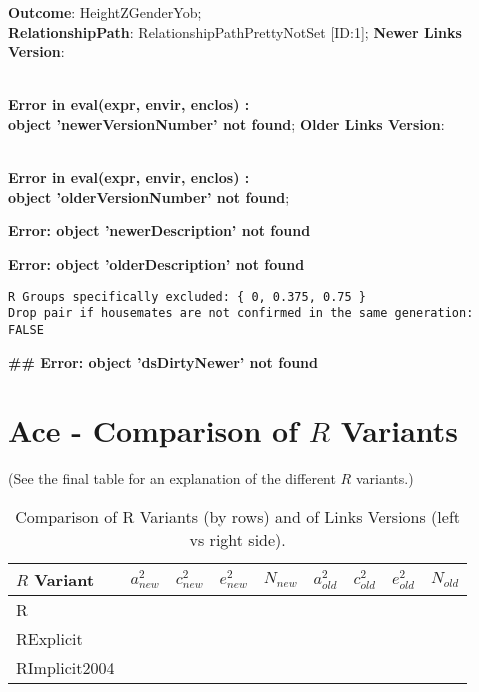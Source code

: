 \documentclass{article}\usepackage{graphicx, color}
\makeatletter
\newenvironment{kframe}{%
 \def\at@end@of@kframe{}%
 \ifinner\ifhmode%
  \def\at@end@of@kframe{\end{minipage}}%
  \begin{minipage}{\columnwidth}%
 \fi\fi%
 \def\FrameCommand##1{\hskip\@totalleftmargin \hskip-\fboxsep
 \colorbox{shadecolor}{##1}\hskip-\fboxsep
     \hskip-\linewidth \hskip-\@totalleftmargin \hskip\columnwidth}%
 \MakeFramed {\advance\hsize-\width
   \@totalleftmargin\z@ \linewidth\hsize
   \@setminipage}}%
 {\par\unskip\endMakeFramed%
 \at@end@of@kframe}
\newenvironment{knitrout}{}{} %
\makeatother
\begin{document}
\textbf{Outcome}: HeightZGenderYob;\\
\textbf{RelationshipPath}: RelationshipPathPrettyNotSet [ID:1];
\textbf{Newer Links Version}: 

{\ttfamily\noindent\bfseries\textcolor{errorcolor}{\\Error in eval(expr, envir, enclos) : \\  object 'newerVersionNumber' not found}};
\textbf{Older Links Version}: 

{\ttfamily\noindent\bfseries\textcolor{errorcolor}{\\Error in eval(expr, envir, enclos) : \\  object 'olderVersionNumber' not found}};

\begin{knitrout}
\color{fgcolor}\begin{kframe}


{\ttfamily\noindent\bfseries\textcolor{errorcolor}{Error: object 'newerDescription' not found}}

{\ttfamily\noindent\bfseries\textcolor{errorcolor}{Error: object 'olderDescription' not found}}\begin{verbatim}
R Groups specifically excluded: { 0, 0.375, 0.75 }
Drop pair if housemates are not confirmed in the same generation: FALSE
\end{verbatim}
\end{kframe}
\end{knitrout}


\begin{kframe}


{\ttfamily\noindent\bfseries\textcolor{errorcolor}{\#\# Error: object 'dsDirtyNewer' not found}}\end{kframe}


\section{Ace - Comparison of $R$ Variants} 
(See the final table for an explanation of the different $R$ variants.)
\begin{table}[ht]
\begin{center}
{\large
\begin{tabular}{l|rrrr|rrrr}
  \hline
$R$ Variant & $a_{new}^2$ & $c_{new}^2$ & $e_{new}^2$ & $N_{new}$ & $a_{old}^2$ & $c_{old}^2$ & $e_{old}^2$ & $N_{old}$ \\ 
  \hline
R &  &  &  &  &  &  &  &  \\ 
  RExplicit &  &  &  &  &  &  &  &  \\ 
  RImplicit2004 &  &  &  &  &  &  &  &  \\ 
   \hline
\end{tabular}
}
\caption{Comparison of R Variants (by rows) and of Links Versions (left vs right side).}
\end{center}
\end{table}
\end{document}
